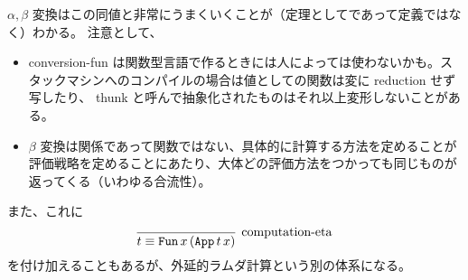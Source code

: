 \(\alpha , \beta\) 変換はこの同値と非常にうまくいくことが（定理としてであって定義ではなく）わかる。
注意として、
\begin{itemize}
  \item conversion-fun は関数型言語で作るときには人によっては使わないかも。スタックマシンへのコンパイルの場合は値としての関数は変に reduction せず写したり、 thunk と呼んで抽象化されたものはそれ以上変形しないことがある。
  \item \(\beta\) 変換は関係であって関数ではない、具体的に計算する方法を定めることが評価戦略を定めることにあたり、大体どの評価方法をつかっても同じものが返ってくる（いわゆる合流性）。
\end{itemize}
また、これに
\[\infer[\text{computation-eta}]{t \equiv \texttt{Fun} \, x \, (\texttt{App} \, t \, x)}{}\]
を付け加えることもあるが、外延的ラムダ計算という別の体系になる。
